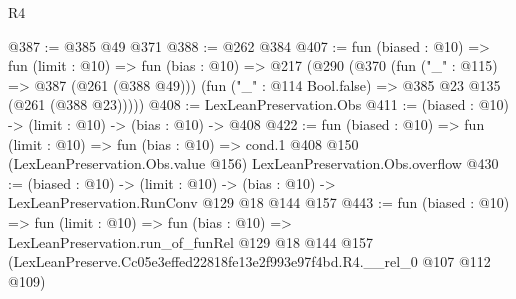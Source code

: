 \begin{lexlean}{R4}
\begin{coremodule}
@387 := @385 @49 @371
@388 := @262 @384
@407 := fun (biased : @10) =>
  fun (limit : @10) =>
  fun (bias : @10) =>
  @217
    (@290
      (@370
        (fun ("_" : @115) => @387 (@261 (@388 @49)))
        (fun ("_" : @114 Bool.false) => @385 @23 @135 (@261 (@388 @23)))))
@408 := LexLeanPreservation.Obs
@411 := (biased : @10) -> (limit : @10) -> (bias : @10) -> @408
@422 := fun (biased : @10) =>
  fun (limit : @10) =>
  fun (bias : @10) =>
  cond.{1} @408 @150 (LexLeanPreservation.Obs.value @156) LexLeanPreservation.Obs.overflow
@430 := (biased : @10) ->
  (limit : @10) -> (bias : @10) -> LexLeanPreservation.RunConv @129 @18 @144 @157
@443 := fun (biased : @10) =>
  fun (limit : @10) =>
  fun (bias : @10) =>
  LexLeanPreservation.run_of_funRel
    @129
    @18
    @144
    @157
    (LexLeanPreserve.Cc05e3effed22818fe13e2f993e97f4bd.R4.__rel_0 @107 @112 @109)
\end{coremodule}
\end{lexlean}
